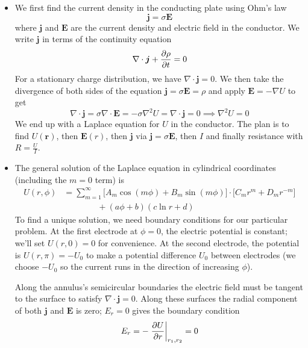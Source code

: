 \documentclass[11pt, a4paper]{article}
\renewcommand{\vec}[1]{\bm{#1}} %
\renewcommand{\r}{\vec{r}}
\newcommand{\E}{\vec{E}}  %
\renewcommand{\div}{\nabla \cdot}
\renewcommand{\grad}{\nabla}
\renewcommand{\laplacian}{\nabla^{2}}
\begin{document}
\begin{itemize}
	\item We first find the current density in the conducting plate using Ohm's law
	\begin{equation*}
		\vec{j} = \sigma \E 
	\end{equation*}
	where $ \vec{j} $ and $ \E $ are the current density and electric field in the conductor. We write $ \vec{j} $ in terms of the continuity equation
	\begin{equation*}
		\div \vec{j} + \pdv{\rho}{t} = 0
	\end{equation*}
	For a stationary charge distribution, we have $ \div \vec{j} = 0 $. We then take the divergence of both sides of the equation $ \vec{j} = \sigma \E = \rho  $ and apply $ \E = - \grad U $ to get
	\begin{equation*}
		\div \vec{j} = \sigma \div \E = - \sigma \laplacian U = \div \vec{j} = 0 \implies \laplacian U = 0
	\end{equation*}
	We end up with a Laplace equation for $ U $ in the conductor. The plan is to find $ U(\r) $, then $ \E(r) $, then $ \vec{j} $ via $ \vec{j} = \sigma \E $, then $ I $ and finally resistance with $ R = \frac{U}{I} $. 
	
	\item The general solution of the Laplace equation in cylindrical coordinates (including the $ m = 0 $ term) is
	\begin{align*}
		U(r, \phi) &= \sum_{m=1}^{\infty} \big[A_{m}\cos(m\phi) + B_{m}\sin(m \phi)\big] \cdot \big[C_{m}r^{m} + D_{m}r^{-m}\big]\\
		& \qquad \qquad  + (a \phi + b)(c \ln r + d)
	\end{align*}
	To find a unique solution, we need boundary conditions for our particular problem. At the first electrode at $ \phi = 0 $, the electric potential is constant; we'll set $ U(r, 0) = 0 $  for convenience. At the second electrode, the potential is $ U(r, \pi)  = -U_{0}$ to make a potential difference $ U_{0} $ between electrodes (we choose $ -U_{0} $ so the current runs in the direction of increasing $ \phi $). 
	
	Along the annulus's semicircular boundaries the electric field must be tangent to the surface to satisfy $ \div \vec{j} = 0 $. Along these surfaces the radial component of both $ \vec{j} $ and $ \E $ is zero; $ E_{r} = 0 $ gives the boundary condition
	\begin{equation*}
		E_{r} = - \eval{\pdv{U}{r}}_{r_{1}, r_{2}} = 0
	\end{equation*}
	

\end{itemize}
\end{document}
